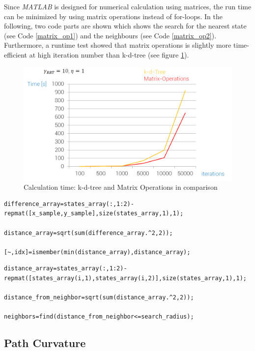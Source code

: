 Since \textit{MATLAB} is designed for numerical calculation using matrices, the run time can be minimized by using matrix operations instead of for-loops. In the following, two code parts are shown which shows the search for the nearest state (see Code \ref{matrix_op1}) and the neighbours (see Code \ref{matrix_op2}). Furthermore, a runtime test showed that matrix operations is slightly more time-efficient at high iteration number than k-d-tree (see figure \ref{pics:runtime}).

\begin{figure} [h]
	\centering
	\includegraphics[width=1\textwidth]{images/runtime.png}
	\caption{Calculation time: k-d-tree and Matrix Operations in comparison}
	\label{pics:runtime}
\end{figure}

\begin{lstlisting}[caption={Nearest State Search},label=matrix_op1]
difference_array=states_array(:,1:2)-repmat([x_sample,y_sample],size(states_array,1),1);

distance_array=sqrt(sum(difference_array.^2,2));

[~,idx]=ismember(min(distance_array),distance_array);
\end{lstlisting}

\begin{lstlisting}[caption={Neighbours Search},label=matrix_op2]
distance_array=states_array(:,1:2)-repmat([states_array(i,1),states_array(i,2)],size(states_array,1),1);
        
distance_from_neighbor=sqrt(sum(distance_array.^2,2));
        
neighbors=find(distance_from_neighbor<=search_radius);
\end{lstlisting}

\subsection{Path Curvature}


